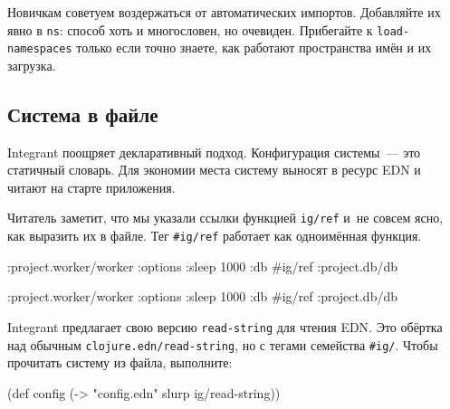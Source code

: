 Новичкам советуем воздержаться от автоматических импортов. Добавляйте их явно в
\verb|ns|: способ хоть и многословен, но очевиден. Прибегайте к
\verb|load-namespaces| только если точно знаете, как работают пространства
имён и их загрузка.

\subsection{Система в файле}


Integrant поощряет декларативный подход. Конфигурация системы~--- это статичный
словарь. Для экономии места систему выносят в ресурс EDN и читают на старте
приложения.


Читатель заметит, что мы указали ссылки функцией \verb|ig/ref| и~не совсем
ясно, как выразить их в файле. Тег \verb|#ig/ref| работает как одноимённая
функция.

\ifx\DEVICETYPE\MOBILE

\begin{english}
  \begin{clojure}
{:project.worker/worker
 {:options {:sleep 1000}
  :db #ig/ref :project.db/db}}
  \end{clojure}
\end{english}

\else

\begin{english}
  \begin{clojure}
{:project.worker/worker {:options {:sleep 1000}
                         :db #ig/ref :project.db/db}}
  \end{clojure}
\end{english}

\fi


\mnoindent
Integrant предлагает свою версию \verb|read-string| для чтения EDN. Это обёртка
над обычным \verb|clojure.edn/read-string|, но с тегами семейства
\verb|#ig/|. Чтобы прочитать систему из файла, выполните:

\begin{english}
  \begin{clojure}
(def config
  (-> "config.edn" slurp ig/read-string))
  \end{clojure}
\end{english}


